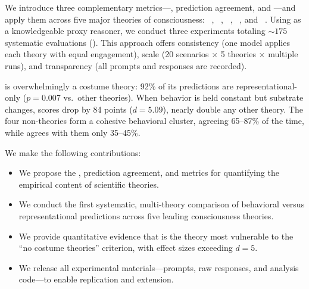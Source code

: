 We introduce three complementary metrics---\costumeratio, prediction agreement, and \costumesens---and apply them across five major theories of consciousness: \IIT~\citep{tononi2016iit}, \GNW~\citep{dehaene2011gnw}, \HOT~\citep{rosenthal2005hot}, \RPT~\citep{lamme2006rpt}, and \AST~\citep{graziano2015attention}.
Using \gptmodel as a knowledgeable proxy reasoner, we conduct three experiments totaling ${\sim}175$ systematic evaluations ().
This approach offers consistency (one model applies each theory with equal engagement), scale (20 scenarios $\times$ 5 theories $\times$ multiple runs), and transparency (all prompts and responses are recorded).

\IIT is overwhelmingly a costume theory: 92\% of its predictions are representational-only ($p = 0.007$ vs.\ other theories).
When behavior is held constant but substrate changes, \IIT scores drop by 84 points ($d = 5.09$), nearly double any other theory.
The four non-\IIT theories form a cohesive behavioral cluster, agreeing 65--87\% of the time, while \IIT agrees with them only 35--45\%.

We make the following contributions:
\begin{itemize}[leftmargin=*,itemsep=0pt,topsep=0pt]
    \item We propose the \costumeratio, prediction agreement, and \costumesens metrics for quantifying the empirical content of scientific theories.
    \item We conduct the first systematic, multi-theory comparison of behavioral versus representational predictions across five leading consciousness theories.
    \item We provide quantitative evidence that \IIT is the theory most vulnerable to the ``no costume theories'' criterion, with effect sizes exceeding $d = 5$.
    \item We release all experimental materials---prompts, raw responses, and analysis code---to enable replication and extension.
\end{itemize}

